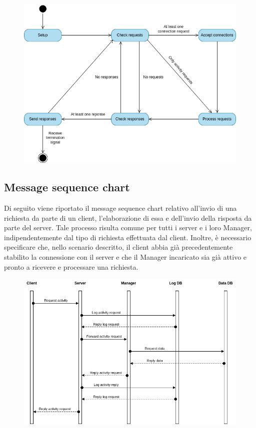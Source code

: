 \documentclass[12pt]{report}
\begin{document}
    \begin{figure}[H]
        \centering
        \includegraphics[scale=0.55]{images/Handler State Diagram.png}
        
        \label{fig:Handler_state_diagram}
    \end{figure}

    \newpage
    
    \subsection{Message sequence chart}
    
    Di seguito viene riportato il message sequence chart relativo all'invio di una richiesta da parte di un client, l'elaborazione di essa e dell'invio della risposta da parte del server. Tale processo risulta comune per tutti i server e i loro Manager, indipendentemente dal tipo di richiesta effettuata dal client. Inoltre, è necessario specificare che, nello scenario descritto, il client abbia già precedentemente stabilito la connessione con il server e che il Manager incaricato sia già attivo e pronto a ricevere e processare una richiesta.
    
    \begin{figure}[H]
        \centering
        \includegraphics[scale=0.55]{images/Message Sequence Chart.png}
        
        \label{fig:message_sequence_chart}
    \end{figure}
\end{document}
